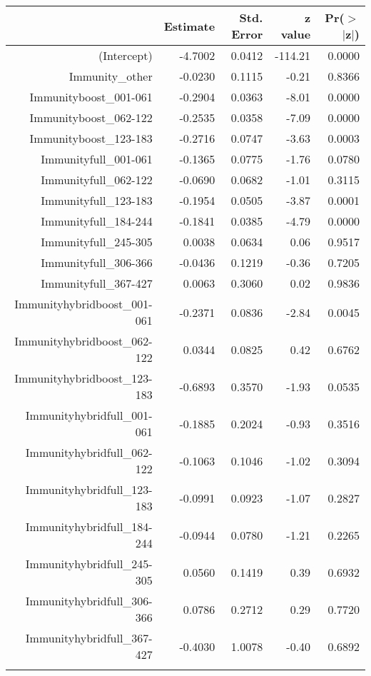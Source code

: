\begin{table}[ht]
\centering
\begin{tabular}{rrrrr}
  \hline
 & Estimate & Std. Error & z value & Pr($>$$|$z$|$) \\ 
  \hline
(Intercept) & -4.7002 & 0.0412 & -114.21 & 0.0000 \\ 
  Immunity\_other & -0.0230 & 0.1115 & -0.21 & 0.8366 \\ 
  Immunityboost\_001-061 & -0.2904 & 0.0363 & -8.01 & 0.0000 \\ 
  Immunityboost\_062-122 & -0.2535 & 0.0358 & -7.09 & 0.0000 \\ 
  Immunityboost\_123-183 & -0.2716 & 0.0747 & -3.63 & 0.0003 \\ 
  Immunityfull\_001-061 & -0.1365 & 0.0775 & -1.76 & 0.0780 \\ 
  Immunityfull\_062-122 & -0.0690 & 0.0682 & -1.01 & 0.3115 \\ 
  Immunityfull\_123-183 & -0.1954 & 0.0505 & -3.87 & 0.0001 \\ 
  Immunityfull\_184-244 & -0.1841 & 0.0385 & -4.79 & 0.0000 \\ 
  Immunityfull\_245-305 & 0.0038 & 0.0634 & 0.06 & 0.9517 \\ 
  Immunityfull\_306-366 & -0.0436 & 0.1219 & -0.36 & 0.7205 \\ 
  Immunityfull\_367-427 & 0.0063 & 0.3060 & 0.02 & 0.9836 \\ 
  Immunityhybridboost\_001-061 & -0.2371 & 0.0836 & -2.84 & 0.0045 \\ 
  Immunityhybridboost\_062-122 & 0.0344 & 0.0825 & 0.42 & 0.6762 \\ 
  Immunityhybridboost\_123-183 & -0.6893 & 0.3570 & -1.93 & 0.0535 \\ 
  Immunityhybridfull\_001-061 & -0.1885 & 0.2024 & -0.93 & 0.3516 \\ 
  Immunityhybridfull\_062-122 & -0.1063 & 0.1046 & -1.02 & 0.3094 \\ 
  Immunityhybridfull\_123-183 & -0.0991 & 0.0923 & -1.07 & 0.2827 \\ 
  Immunityhybridfull\_184-244 & -0.0944 & 0.0780 & -1.21 & 0.2265 \\ 
  Immunityhybridfull\_245-305 & 0.0560 & 0.1419 & 0.39 & 0.6932 \\ 
  Immunityhybridfull\_306-366 & 0.0786 & 0.2712 & 0.29 & 0.7720 \\ 
  Immunityhybridfull\_367-427 & -0.4030 & 1.0078 & -0.40 & 0.6892 \\ 
$$
\end{tabular}
\end{table}
